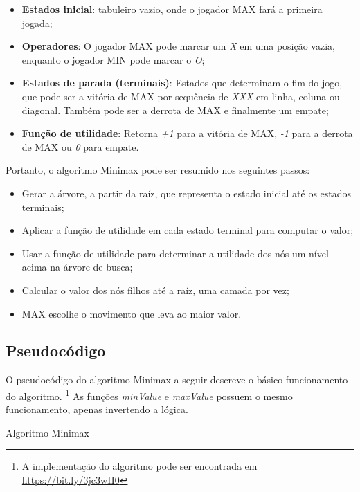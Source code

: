 \documentclass[sigplan,screen]{acmart}
\begin{document}
\begin{itemize}
  \item \textbf{Estados inicial}: tabuleiro vazio, onde o jogador MAX fará a primeira jogada;
  \item \textbf{Operadores}: O jogador MAX pode marcar um {\itshape X} em uma posição vazia, enquanto o jogador MIN pode marcar o {\itshape O};
  \item \textbf{Estados de parada (terminais)}: Estados que determinam o fim do jogo, que pode ser a vitória de MAX por sequência de {\itshape XXX} em linha, coluna ou diagonal. 
  Também pode ser a derrota de MAX e finalmente um empate;
  \item \textbf{Função de utilidade}: Retorna {\itshape +1} para a vitória de MAX, {\itshape -1} para a derrota de MAX ou {\itshape 0} para empate.
\end{itemize}

Portanto, o algoritmo Minimax pode ser resumido nos seguintes passos:

\begin{itemize}
  \item Gerar a árvore, a partir da raíz, que representa o estado inicial até os estados terminais;
  \item Aplicar a função de utilidade em cada estado terminal para computar o valor;
  \item Usar a função de utilidade para determinar a utilidade dos nós um nível acima na árvore de busca;
  \item Calcular o valor dos nós filhos até a raíz, uma camada por vez;
  \item MAX escolhe o movimento que leva ao maior valor.
\end{itemize}

\subsection{Pseudocódigo}
O pseudocódigo do algoritmo Minimax a seguir descreve o básico funcionamento do algoritmo. 
\footnote{A implementação do algoritmo pode ser encontrada em \href{https://bit.ly/3jc3wH0}{https://bit.ly/3jc3wH0}}
As funções {\itshape minValue} e {\itshape maxValue} possuem o mesmo funcionamento, apenas invertendo a lógica.


\begin{algorithm}
\DontPrintSemicolon
  \caption{Algoritmo Minimax}
  \label{alg:generator}
\end{algorithm}
\end{document}
